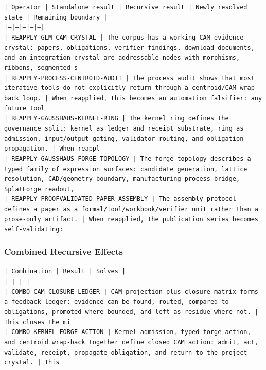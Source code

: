 \documentclass[11pt]{article}
\begin{document}
\noindent\texttt{| Operator | Standalone result | Recursive result | Newly resolved state | Remaining boundary |}\\
\noindent\texttt{|---|---|---|---|---|}\\
\noindent\texttt{| REAPPLY-GLM-CAM-CRYSTAL | The corpus has a working CAM evidence crystal: papers, obligations, verifier findings, download documents, and an integration crystal are addressable nodes with morphisms, ribbons, segmented s}\\
\noindent\texttt{| REAPPLY-PROCESS-CENTROID-AUDIT | The process audit shows that most iterative tools do not explicitly return through a centroid/CAM wrap-back loop. | When reapplied, this becomes an automation falsifier: any future tool}\\
\noindent\texttt{| REAPPLY-GAUSSHAUS-KERNEL-RING | The kernel ring defines the governance split: kernel as ledger and receipt substrate, ring as admission, input/output gating, validator routing, and obligation propagation. | When reappl}\\
\noindent\texttt{| REAPPLY-GAUSSHAUS-FORGE-TOPOLOGY | The forge topology describes a typed family of expression surfaces: candidate generation, lattice resolution, CAD/geometry boundary, manufacturing process bridge, SplatForge readout, }\\
\noindent\texttt{| REAPPLY-PROOFVALIDATED-PAPER-ASSEMBLY | The assembly protocol defines a paper as a formal/tool/workbook/verifier unit rather than a prose-only artifact. | When reapplied, the publication series becomes self-validating:}\\

\subsubsection*{Combined Recursive Effects}

\noindent\texttt{| Combination | Result | Solves |}\\
\noindent\texttt{|---|---|---|}\\
\noindent\texttt{| COMBO-CAM-CLOSURE-LEDGER | CAM projection plus closure matrix forms a feedback ledger: evidence can be found, routed, compared to obligations, promoted where bounded, and left as residue where not. | This closes the mi}\\
\noindent\texttt{| COMBO-KERNEL-FORGE-ACTION | Kernel admission, typed forge action, and centroid wrap-back together define closed CAM action: admit, act, validate, receipt, propagate obligation, and return to the project crystal. | This}\\
\end{document}
